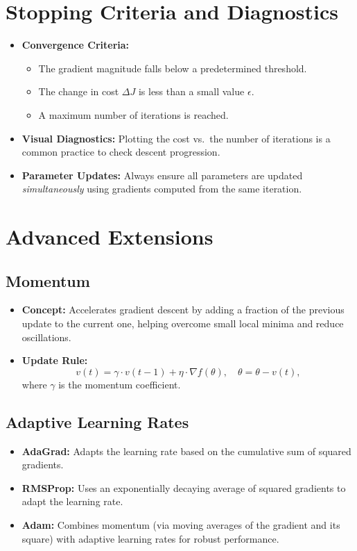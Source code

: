 \documentclass{article}
\begin{document}
\section{Stopping Criteria and Diagnostics}

\begin{itemize}
    \item \textbf{Convergence Criteria:}
    \begin{itemize}[label=\(\bullet\)]
        \item The gradient magnitude falls below a predetermined threshold.
        \item The change in cost \(\Delta J\) is less than a small value \(\epsilon\).
        \item A maximum number of iterations is reached.
    \end{itemize}
    \item \textbf{Visual Diagnostics:} Plotting the cost vs.\ the number of iterations is a common practice to check descent progression.
    \item \textbf{Parameter Updates:} Always ensure all parameters are updated \emph{simultaneously} using gradients computed from the same iteration.
\end{itemize}

\section{Advanced Extensions}

\subsection{Momentum}
\begin{itemize}
    \item \textbf{Concept:} Accelerates gradient descent by adding a fraction of the previous update to the current one, helping overcome small local minima and reduce oscillations.
    \item \textbf{Update Rule:}
    \[
    v(t) = \gamma \cdot v(t-1) + \eta \cdot \nabla f(\theta), 
    \quad 
    \theta = \theta - v(t),
    \]
    where \(\gamma\) is the momentum coefficient.
\end{itemize}

\subsection{Adaptive Learning Rates}
\begin{itemize}
    \item \textbf{AdaGrad:} Adapts the learning rate based on the cumulative sum of squared gradients.
    \item \textbf{RMSProp:} Uses an exponentially decaying average of squared gradients to adapt the learning rate.
    \item \textbf{Adam:} Combines momentum (via moving averages of the gradient and its square) with adaptive learning rates for robust performance.
\end{itemize}
\end{document}
